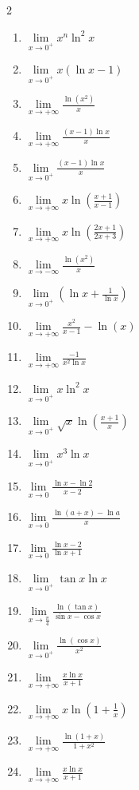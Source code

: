 \documentclass[12pt,a4paper]{article}
\begin{document}
\begin{multicols}{2}
\begin{enumerate}
\item $ \lim\limits_{x \to 0^+} x^n \ln^2 x $
\item $ \lim\limits_{x \to 0^+} x (\ln x - 1) $ 
\item $ \lim\limits_{x \to +\infty} \frac{\ln(x^2)}{x} $
\item $ \lim\limits_{x \to +\infty} \frac{(x - 1) \ln x}{x} $
\item $ \lim\limits_{x \to 0^+} \frac{(x - 1) \ln x}{x} $

\item $ \lim\limits_{x \to +\infty} x \ln\left(\frac{x+1}{x-1}\right) $ 
\item $ \lim\limits_{x \to +\infty} x \ln\left(\frac{2x+1}{2x+3}\right) $ 
\item $ \lim\limits_{x \to -\infty} \frac{\ln(x^2)}{x} $
\item $ \lim\limits_{x \to 0^+} \left(\ln x + \frac{1}{\ln x}\right) $


\item $ \lim\limits_{x \to +\infty} \frac{x^2}{x-1} - \ln(x) $ 
\item $ \lim\limits_{x \to +\infty} \frac{-1}{x^2 \ln x} $ 
\item $ \lim\limits_{x \to 0^+} x \ln^2 x $ 
\item $ \lim\limits_{x \to 0^+} \sqrt{x} \ln\left(\frac{x+1}{x}\right) $ 
\item $ \lim\limits_{x \to 0^+} x^3 \ln x $


\item $ \lim\limits_{x \to 0} \frac{\ln x - \ln 2}{x-2} $
\item $ \lim\limits_{x \to 0} \frac{\ln(a+x) - \ln a}{x} $
\item $ \lim\limits_{x \to 0} \frac{\ln x - 2}{\ln x + 1} $ 
\item $ \lim\limits_{x \to 0^+} \tan x \ln x $ 
\item $ \lim\limits_{x \to \frac{\pi}{4}} \frac{\ln(\tan x)}{\sin x - \cos x} $

\item $ \lim\limits_{x \to 0^+} \frac{\ln(\cos x)}{x^2} $
\item $ \lim\limits_{x \to +\infty} \frac{x \ln x}{x+1} $ 
\item $ \lim\limits_{x \to +\infty} x \ln\left(1 + \frac{1}{x}\right) $ 
\item $ \lim\limits_{x \to +\infty} \frac{\ln(1+x)}{1+x^2} $
\item $ \lim\limits_{x \to +\infty} \frac{x \ln x}{x+1} $


\end{enumerate}
\end{multicols}
\end{document}
